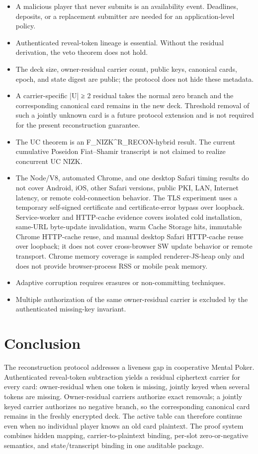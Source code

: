 \documentclass[11pt]{article}
\begin{document}
\begin{itemize}
\item A malicious player that never submits is an availability event. Deadlines, deposits, or a replacement submitter are needed for an application-level policy.
\item Authenticated reveal-token lineage is essential. Without the residual derivation, the veto theorem does not hold.
\item The deck size, owner-residual carrier count, public keys, canonical cards, epoch, and state digest are public; the protocol does not hide these metadata.
\item A carrier-specific |U| ≥ 2 residual takes the normal zero branch and the corresponding canonical card remains in the new deck. Threshold removal of such a jointly unknown card is a future protocol extension and is not required for the present reconstruction guarantee.
\item The UC theorem is an F\_NIZK\^{}R\_RECON-hybrid result. The current cumulative Poseidon Fiat–Shamir transcript is not claimed to realize concurrent UC NIZK.
\item The Node/V8, automated Chrome, and one desktop Safari timing results do not cover Android, iOS, other Safari versions, public PKI, LAN, Internet latency, or remote cold-connection behavior. The TLS experiment uses a temporary self-signed certificate and certificate-error bypass over loopback. Service-worker and HTTP-cache evidence covers isolated cold installation, same-URL byte-update invalidation, warm Cache Storage hits, immutable Chrome HTTP-cache reuse, and manual desktop Safari HTTP-cache reuse over loopback; it does not cover cross-browser SW update behavior or remote transport. Chrome memory coverage is sampled renderer-JS-heap only and does not provide browser-process RSS or mobile peak memory.
\item Adaptive corruption requires erasures or non-committing techniques.
\item Multiple authorization of the same owner-residual carrier is excluded by the authenticated missing-key invariant.
\end{itemize}
\section{Conclusion}

The reconstruction protocol addresses a liveness gap in cooperative Mental Poker. Authenticated reveal-token subtraction yields a residual ciphertext carrier for every card: owner-residual when one token is missing, jointly keyed when several tokens are missing. Owner-residual carriers authorize exact removals; a jointly keyed carrier authorizes no negative branch, so the corresponding canonical card remains in the freshly encrypted deck. The active table can therefore continue even when no individual player knows an old card plaintext. The proof system combines hidden mapping, carrier-to-plaintext binding, per-slot zero-or-negative semantics, and state/transcript binding in one auditable package.
\end{document}
